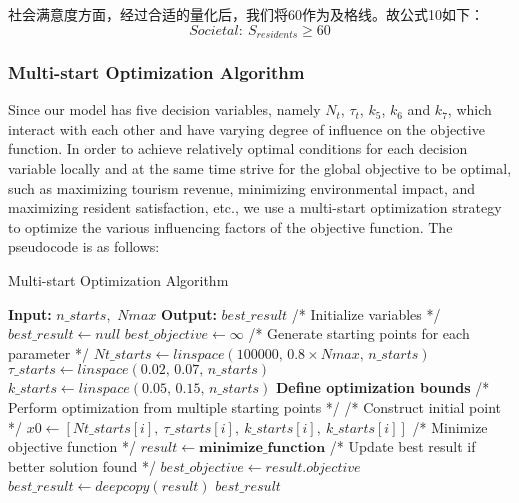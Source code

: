 \documentclass[12pt]{article}  %
\begin{document}
社会满意度方面，经过合适的量化后，我们将60作为及格线。故公式10如下：
\begin{equation}
	Societal:\ S_{residents} \geqslant 60
\end{equation}	
\subsubsection{Multi-start Optimization Algorithm}
Since our model has five decision variables, namely \(N_t\), \(\tau_t\), \(k_5\), \(k_6\) and \(k_7\), which interact with each other and have varying degree of influence on the objective function. In order to achieve relatively optimal conditions for each decision variable locally and at the same time strive for the global objective to be optimal, such as maximizing tourism revenue, minimizing environmental impact, and maximizing resident satisfaction, etc., we use a multi-start optimization strategy to optimize the various influencing factors of the objective function. The pseudocode is as follows:
\begin{algorithm}
	\caption{Multi-start Optimization Algorithm}
	\begin{algorithmic}[1]
		\STATE \textbf{Input:} $n\_starts$,\ $Nmax$
		\STATE \textbf{Output:} $best\_result$
		\vspace{0.2cm}
		\STATE /* Initialize variables */
		\STATE $best\_result\leftarrow null$
		\STATE $best\_objective\leftarrow \infty$
		\STATE /* Generate starting points for each parameter */
		\STATE $Nt\_starts\leftarrow linspace(100000,\,0.8\times Nmax,\,n\_starts)$
		\STATE $\tau\_starts\leftarrow linspace(0.02,\,0.07,\,n\_starts)$
		\STATE $k\_starts\leftarrow linspace(0.05,\,0.15,\,n\_starts)$
		\vspace{0.2cm}
		\STATE \textbf{Define optimization bounds}
		\vspace{0.2cm}
		\STATE /* Perform optimization from multiple starting points */
		\STATE /* Construct initial point */
		\STATE $x0\leftarrow [Nt\_starts[i],\ \tau\_starts[i],\ k\_starts[i],\ k\_starts[i]]$
		\STATE /* Minimize objective function */
		\STATE $result\leftarrow \textbf{minimize\_function}$
		\STATE /* Update best result if better solution found */
		\STATE $best\_objective\leftarrow result.objective$
		\STATE $best\_result\leftarrow deepcopy(result)$
		\ENDIF
		\ENDFOR
		\vspace{0.2cm}
		\RETURN $best\_result$
	\end{algorithmic}
\end{algorithm}
\end{document}
